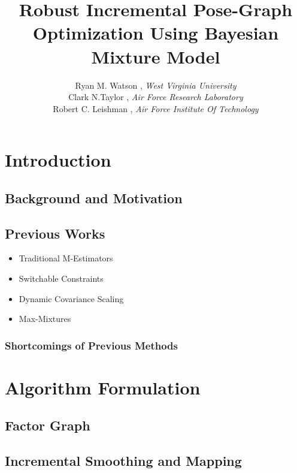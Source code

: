 \documentclass[ugly]{ion}
\begin{document}
\title{Robust Incremental Pose-Graph Optimization Using Bayesian Mixture Model \\ }
\author{Ryan M. Watson , { \it West Virginia University} \\   
		Clark N.Taylor , {\it Air Force Research Laboratory} \\ 
	    Robert C. Leishman , {\it Air Force Institute Of Technology} }
\maketitle


\begin{abstract}
 
\end{abstract}

\section{Introduction}
\subsection{Background and Motivation}


\subsection{Previous Works}

	\begin{itemize}
		\item Traditional M-Estimators
		\item Switchable Constraints
		\item Dynamic Covariance Scaling 
		\item Max-Mixtures
	\end{itemize}

\subsubsection{Shortcomings of Previous Methods}

 
\section{Algorithm Formulation}
	\subsection{Factor Graph}
	\subsection{Incremental Smoothing and Mapping}
\end{document}

